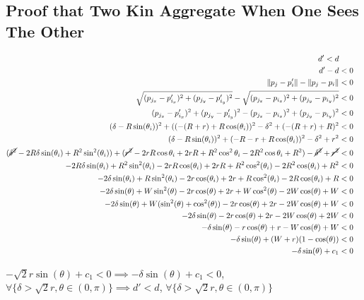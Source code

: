 \documentclass[conference]{IEEEtran}
\begin{document}
  \subsection{Proof that Two Kin Aggregate When One Sees The Other} \label{apx:two_agg_1}
    \begin{align*}
      d' < d \\
      d' - d &< 0 \\
      \lVert p_j - p'_i \rVert - \lVert p_j - p_i \rVert &< 0 \\
      \sqrt{(p_{j_x} - p'_{i_x})^2 + (p_{j_y} - p'_{i_y})^2} - \sqrt{(p_{j_x} - p_{i_x})^2 + (p_{j_y} - p_{i_y})^2} &< 0 \\
      (p_{j_x} - p'_{i_x})^2 + (p_{j_y} - p'_{i_y})^2 - (p_{j_x} - p_{i_x})^2 + (p_{j_y} - p_{i_y})^2 &< 0 \\
      (\delta - R\sin(\theta_i))^2 + ((-(R+r) + R\cos(\theta_i))^2 - \delta^2 + (-(R+r) + R)^2 &< 0 \\
      (\delta - R\sin(\theta_i))^2 + (-R-r+R\cos(\theta_i))^2 - \delta^2 + r^2 &< 0 \\
      (\cancel{\delta^2} - 2R\delta\sin(\theta_i) + R^2\sin^2(\theta_i)) + (\cancel{r^2}-2rR\cos{\theta_i}+2rR+R^2\cos^2{\theta_i}-2R^2\cos{\theta_i}+R^2) - \cancel{\delta^2} + \cancel{r^2} &< 0 \\
      -2R\delta\sin(\theta_i) + R^2\sin^2(\theta_i) - 2rR\cos(\theta_i)+2rR+R^2\cos^2(\theta_i)- 2R^2\cos(\theta_i) + R^2 &< 0 \\
      -2\delta\sin(\theta_i) + R\sin^2(\theta_i) - 2r\cos(\theta_i)+2r+R\cos^2(\theta_i)- 2R\cos(\theta_i) + R &< 0 \\
      -2\delta\sin(\theta) + W\sin^2(\theta) - 2r\cos(\theta)+2r+W\cos^2(\theta)- 2W\cos(\theta) + W &< 0 \\
      -2\delta\sin(\theta) + W(\sin^2(\theta)+\cos^2(\theta)) - 2r\cos(\theta) + 2r - 2W\cos(\theta) + W &< 0 \\
      -2\delta\sin(\theta) - 2r\cos(\theta) + 2r - 2W\cos(\theta) + 2W &< 0 \\
      -\delta\sin(\theta) - r\cos(\theta) + r - W\cos(\theta) + W &< 0 \\
      -\delta\sin(\theta) + (W+r)(1 - \cos(\theta)) &< 0 \\
      -\delta\sin(\theta) + c_1 &< 0
    \end{align*}

    $-\sqrt{2}r\sin(\theta) + c_1<0 \implies -\delta\sin(\theta) + c_1<0$, $\forall \{\delta > \sqrt{2}r, \theta\in(0,\pi)\} \implies d'<d$, $\forall \{\delta > \sqrt{2}r, \theta\in(0,\pi)\}$
\end{document}
